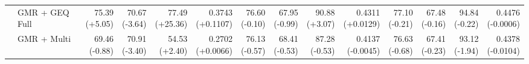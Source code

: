 \documentclass{article}
\begin{document}
{\begin{tabular}{llrrrrrrrrrrrr}
 & GMR + GEQ Full & \shortstack{75.39 \\ {\scriptsize\textcolor{Gain}{(+5.05)}}} & \shortstack{70.67 \\ {\scriptsize\textcolor{Loss}{(-3.64)}}} & \shortstack{77.49 \\ {\scriptsize\textcolor{Gain}{(+25.36)}}} & \shortstack{0.3743 \\ {\scriptsize\textcolor{Gain}{(+0.1107)}}} & \shortstack{76.60 \\ {\scriptsize\textcolor{Loss}{(-0.10)}}} & \shortstack{67.95 \\ {\scriptsize\textcolor{Loss}{(-0.99)}}} & \shortstack{90.88 \\ {\scriptsize\textcolor{Gain}{(+3.07)}}} & \shortstack{0.4311 \\ {\scriptsize\textcolor{Gain}{(+0.0129)}}} & \shortstack{77.10 \\ {\scriptsize\textcolor{Loss}{(-0.21)}}} & \shortstack{67.48 \\ {\scriptsize\textcolor{Loss}{(-0.16)}}} & \shortstack{94.84 \\ {\scriptsize\textcolor{Loss}{(-0.22)}}} & \shortstack{0.4476 \\ {\scriptsize\textcolor{Loss}{(-0.0006)}}} \\
 & GMR + Multi & \shortstack{69.46 \\ {\scriptsize\textcolor{Loss}{(-0.88)}}} & \shortstack{70.91 \\ {\scriptsize\textcolor{Loss}{(-3.40)}}} & \shortstack{54.53 \\ {\scriptsize\textcolor{Gain}{(+2.40)}}} & \shortstack{0.2702 \\ {\scriptsize\textcolor{Gain}{(+0.0066)}}} & \shortstack{76.13 \\ {\scriptsize\textcolor{Loss}{(-0.57)}}} & \shortstack{68.41 \\ {\scriptsize\textcolor{Loss}{(-0.53)}}} & \shortstack{87.28 \\ {\scriptsize\textcolor{Loss}{(-0.53)}}} & \shortstack{0.4137 \\ {\scriptsize\textcolor{Loss}{(-0.0045)}}} & \shortstack{76.63 \\ {\scriptsize\textcolor{Loss}{(-0.68)}}} & \shortstack{67.41 \\ {\scriptsize\textcolor{Loss}{(-0.23)}}} & \shortstack{93.12 \\ {\scriptsize\textcolor{Loss}{(-1.94)}}} & \shortstack{0.4378 \\ {\scriptsize\textcolor{Loss}{(-0.0104)}}} \\

\end{tabular}}
\end{document}
